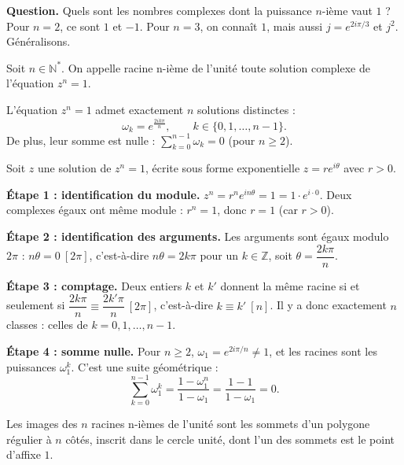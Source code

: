\documentclass[11pt]{article}
\newcommand{\cle}[1]{{\popxbold\color{popdark}#1}}
\newcounter{popsec}
\newcounter{popsub}
\newcommand{\courssub}[1]{%
  \stepcounter{popsub}%
  \par\vspace{9pt}\noindent{\popxbold\fontsize{11.5}{13}\selectfont\color{popink}{\color{poporange}\thepopsec.\thepopsub}\hspace{6pt}#1}\par\nopagebreak\vspace{4pt}
}
\begin{document}
\courssub{Racines n-ièmes de l'unité}

\textbf{Question.} Quels sont les nombres complexes dont la puissance $n$-ième vaut $1$ ? Pour $n = 2$, ce sont $1$ et $-1$. Pour $n = 3$, on connaît $1$, mais aussi $j = e^{2i\pi/3}$ et $j^2$. Généralisons.

\begin{definition}
Soit $n \in \mathbb{N}^*$. On appelle \cle{racine n-ième de l'unité} toute solution complexe de l'équation $z^n = 1$.
\end{definition}

\begin{propriete}
L'équation $z^n = 1$ admet exactement $n$ solutions distinctes :
\[
\omega_k = e^{\frac{2ik\pi}{n}}, \qquad k \in \{0, 1, \ldots, n-1\}.
\]
De plus, leur somme est nulle : $\displaystyle\sum_{k=0}^{n-1} \omega_k = 0$ (pour $n \geq 2$).
\end{propriete}

\begin{experience}
Soit $z$ une solution de $z^n = 1$, écrite sous forme exponentielle $z = re^{i\theta}$ avec $r > 0$.

\textbf{Étape 1 : identification du module.} $z^n = r^n e^{in\theta} = 1 = 1 \cdot e^{i \cdot 0}$. Deux complexes égaux ont même module : $r^n = 1$, donc $r = 1$ (car $r > 0$).

\textbf{Étape 2 : identification des arguments.} Les arguments sont égaux modulo $2\pi$ : $n\theta = 0 \ [2\pi]$, c'est-à-dire $n\theta = 2k\pi$ pour un $k \in \mathbb{Z}$, soit $\theta = \dfrac{2k\pi}{n}$.

\textbf{Étape 3 : comptage.} Deux entiers $k$ et $k'$ donnent la même racine si et seulement si $\dfrac{2k\pi}{n} \equiv \dfrac{2k'\pi}{n} \ [2\pi]$, c'est-à-dire $k \equiv k' \ [n]$. Il y a donc exactement $n$ classes : celles de $k = 0, 1, \ldots, n-1$.

\textbf{Étape 4 : somme nulle.} Pour $n \geq 2$, $\omega_1 = e^{2i\pi/n} \neq 1$, et les racines sont les puissances $\omega_1^k$. C'est une suite géométrique :
\[
\sum_{k=0}^{n-1} \omega_1^k = \frac{1 - \omega_1^n}{1 - \omega_1} = \frac{1-1}{1-\omega_1} = 0.
\]
\end{experience}

\begin{propriete}
Les images des $n$ racines n-ièmes de l'unité sont les sommets d'un \cle{polygone régulier} à $n$ côtés, inscrit dans le cercle unité, dont l'un des sommets est le point d'affixe $1$.
\end{propriete}
\end{document}
